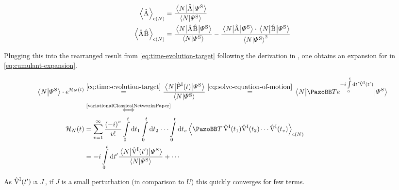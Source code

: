 \begin{equation}
    \label{eq:cumulant-expansion-coefficients}
    \begin{split}
        \left\langle\Aop\right\rangle_{\text{c}(N)} &= \frac{ \bracketHelper{N}{\Aop}{\picturePsi[\schroedingerPicture]{}}}{\braketHelper{N}{\picturePsi[\schroedingerPicture]{}}}\\
        \left\langle\Aop\Bop\right\rangle_{\text{c}(N)} &= \frac{\bracketHelper{N}{\Aop\Bop}{\picturePsi[\schroedingerPicture]{}}}{\braketHelper{N}{\picturePsi[\schroedingerPicture]{}}} -  \frac{\bracketHelper{N}{\Aop}{\picturePsi[\schroedingerPicture]{}} \cdot \bracketHelper{N}{\Bop}{\picturePsi[\schroedingerPicture]{}}}{\braketHelper{N}{\picturePsi[\schroedingerPicture]{}}^2}\\
    \end{split}
\end{equation}

Plugging this into the rearranged result from \autoref{eq:time-evolution-target} following the derivation in \cite{variationalClassicalNetworksPaper}, one obtains an expansion for \HNOft in \autoref{eq:cumulant-expansion}.

\begin{equation}
    \label{eq:cumulant-expansion}
    \begin{split}
        \braketHelper{N}{\picturePsi[\schroedingerPicture]{}} \cdot e^{\HNOft} &\stackrel{\ref{eq:time-evolution-target}}{=} \frac{\bracketHelper{N}{\timeEvolutionOperator[\interactionPicture]}{\picturePsi[\schroedingerPicture]{}}}{\braketHelper{N}{\picturePsi[\schroedingerPicture]{}}}
        \stackrel{\ref{eq:solve-equation-of-motion}}{=}
        \bracketHelper{N}{
            \timeOrderingOperator e^{-i\int\limits_0^t \text{d} t' \VhamiltonianOf[\interactionPicture]{t'}}
        }{\picturePsi[\schroedingerPicture]{}}\\
        &\stackrel{\text{\cite{variationalClassicalNetworksPaper}}}{\Longleftrightarrow}\\
        \HNOft &= \sum\limits_{v=1}^\infty \frac{\left(-i\right)^v}{v!} \int\limits_0^t\mathrm{d}t_1 \int\limits_0^t\mathrm{d}t_2 \,\,\dots \int\limits_0^t\mathrm{d}t_v \left\langle \timeOrderingOperator\, \VhamiltonianOf[\interactionPicture]{t_1}\VhamiltonianOf[\interactionPicture]{t_2} \cdots \VhamiltonianOf[\interactionPicture]{t_v} \right\rangle_{\text{c}(N)}\\
        &= -i \int\limits_0^t \mathrm{d}t' \frac{\bracketHelper{N}{\VhamiltonianOf[\interactionPicture]{t'}}{\picturePsi[\schroedingerPicture]{}}}{\braketHelper{N}{\picturePsi[\schroedingerPicture]{}}} + \cdots
    \end{split}
\end{equation}

As $\VhamiltonianOf[\interactionPicture]{t'} \propto J$, if $J$ is a small perturbation (in comparison to $U$) this quickly converges for few terms.